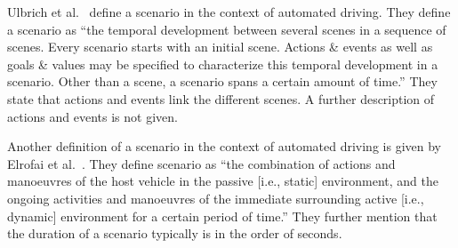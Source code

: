 Ulbrich et al.\ \cite{ulbrich2015} define a scenario in the context of automated driving. They define a scenario as ``the temporal development between several scenes in a sequence of scenes. Every scenario starts with an initial scene. Actions \& events as well as goals \& values may be specified to characterize this temporal development in a scenario. Other than a scene, a scenario spans a certain amount of time.'' They state that actions and events link the different scenes. A further description of actions and events is not given.

Another definition of a scenario in the context of automated driving is given by Elrofai et al.\ \cite{elrofai2016scenario}. They define scenario as ``the combination of actions and manoeuvres of the host vehicle in the passive [i.e., static] environment, and the ongoing activities and manoeuvres of the immediate surrounding active [i.e., dynamic] environment for a certain period of time.'' They further mention that the duration of a scenario typically is in the order of seconds.

